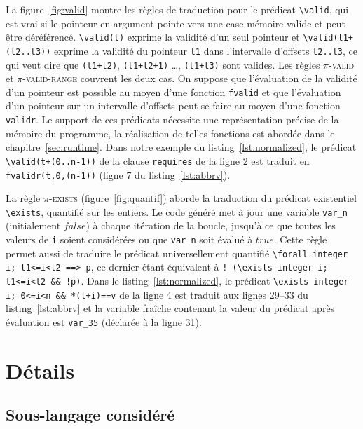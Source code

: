 La figure~\ref{fig:valid} montre les règles de traduction pour le prédicat
\lstinline|\valid|, qui est vrai si le pointeur en argument pointe vers une
case mémoire valide et peut être déréférencé.
\lstinline'\valid(t)' exprime la validité d'un seul pointeur et
\lstinline'\valid(t1+(t2..t3))' exprime la validité du pointeur \lstinline't1'
dans l'intervalle d'offsets \lstinline't2..t3', ce qui veut dire que
\lstinline'(t1+t2)', \lstinline'(t1+t2+1)' \dots, \lstinline'(t1+t3)' sont
valides.
Les règles \textsc{$\pi$-valid} et \textsc{$\pi$-valid-range} couvrent les deux
cas.
On suppose que l'évaluation de la validité d'un pointeur est possible au moyen
d'une fonction \lstinline'fvalid' et que l'évaluation d'un pointeur sur un
intervalle d'offsets peut se faire au moyen d'une fonction
\lstinline'validr'.
Le support de ces prédicats nécessite une représentation précise de la mémoire
du programme, la réalisation de telles fonctions est abordée dans le
chapitre~\ref{sec:runtime}.
Dans notre exemple du listing~\ref{lst:normalized}, le prédicat
\lstinline|\valid(t+(0..n-1))| de la clause \lstinline|requires| de la ligne 2
est traduit en \lstinline[style=c]|fvalidr(t,0,(n-1))| (ligne 7 du
listing~\ref{lst:abbrv}).

La règle \textsc{$\pi$-exists} (figure~\ref{fig:quantif}) aborde la traduction
du prédicat existentiel \lstinline'\exists', quantifié sur les entiers.
Le code généré met à jour une variable \lstinline'var_n' (initialement $false$)
à chaque itération de la boucle, jusqu'à ce que toutes les valeurs de
\lstinline'i' soient considérées ou que \lstinline'var_n' soit évalué à $true$.
Cette règle permet aussi de traduire le prédicat universellement quantifié
\lstinline{\forall integer i; t1<=i<t2 ==> p}, ce dernier étant équivalent à
\lstinline{! (\exists integer i; t1<=i<t2 && !p)}.
Dans le listing~\ref{lst:normalized}, le prédicat
\lstinline{\exists integer i; 0<=i<n && *(t+i)==v} de la ligne 4 est traduit
aux lignes 29--33 du listing~\ref{lst:abbrv} et la variable fraîche contenant la
valeur du prédicat après évaluation est \lstinline|var_35| (déclarée à la
ligne 31).



\section{Détails}
\label{sec:details}
\subsection{Sous-langage considéré}

